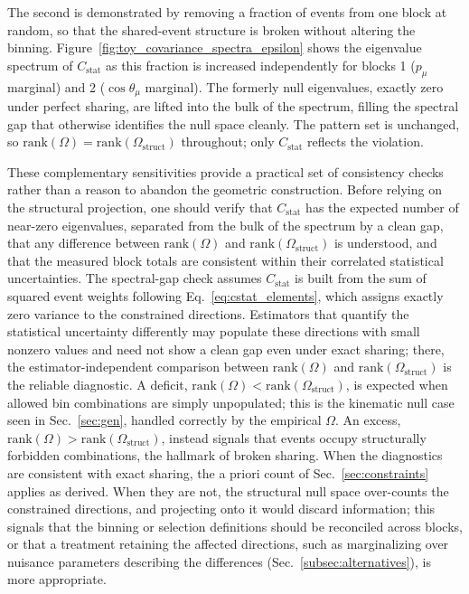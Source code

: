 \documentclass[a4paper,11pt]{article}
\begin{document}
The second is demonstrated by removing a fraction of events from one block at random, so that the shared-event structure is broken without altering the binning. Figure~\ref{fig:toy_covariance_spectra_epsilon} shows the eigenvalue spectrum of $C_{\text{stat}}$ as this fraction is increased independently for blocks 1 ($p_{\mu}$ marginal) and 2 ($\cos\theta_{\mu}$ marginal). The formerly null eigenvalues, exactly zero under perfect sharing, are lifted into the bulk of the spectrum, filling the spectral gap that otherwise identifies the null space cleanly. The pattern set is unchanged, so $\mathrm{rank}(\Omega) = \mathrm{rank}(\Omega_{\text{struct}})$ throughout; only $C_{\text{stat}}$ reflects the violation.

These complementary sensitivities provide a practical set of consistency checks rather than a reason to abandon the geometric construction. Before relying on the structural projection, one should verify that $C_{\text{stat}}$ has the expected number of near-zero eigenvalues, separated from the bulk of the spectrum by a clean gap, that any difference between $\mathrm{rank}(\Omega)$ and $\mathrm{rank}(\Omega_{\text{struct}})$ is understood, and that the measured block totals are consistent within their correlated statistical uncertainties. The spectral-gap check assumes $C_{\text{stat}}$ is built from the sum of squared event weights following Eq.~\eqref{eq:cstat_elements}, which assigns exactly zero variance to the constrained directions. Estimators that quantify the statistical uncertainty differently may populate these directions with small nonzero values and need not show a clean gap even under exact sharing; there, the estimator-independent comparison between $\mathrm{rank}(\Omega)$ and $\mathrm{rank}(\Omega_{\text{struct}})$ is the reliable diagnostic. A deficit, $\mathrm{rank}(\Omega) < \mathrm{rank}(\Omega_{\text{struct}})$, is expected when allowed bin combinations are simply unpopulated; this is the kinematic null case seen in Sec.~\ref{sec:gen}, handled correctly by the empirical $\Omega$. An excess, $\mathrm{rank}(\Omega) > \mathrm{rank}(\Omega_{\text{struct}})$, instead signals that events occupy structurally forbidden combinations, the hallmark of broken sharing. When the diagnostics are consistent with exact sharing, the a priori count of Sec.~\ref{sec:constraints} applies as derived. When they are not, the structural null space over-counts the constrained directions, and projecting onto it would discard information; this signals that the binning or selection definitions should be reconciled across blocks, or that a treatment retaining the affected directions, such as marginalizing over nuisance parameters describing the differences (Sec.~\ref{subsec:alternatives}), is more appropriate.
\end{document}
